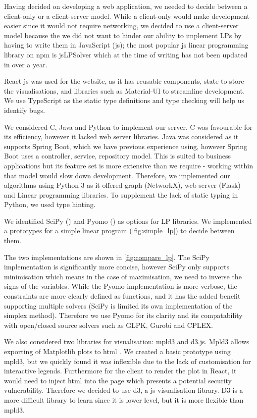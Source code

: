 Having decided on developing a web application, we needed to decide between a client-only or a client-server model. While a client-only would make development easier since it would not require networking, we decided to use a client-server model because the we did not want to hinder our ability to implement LPs by having to write them in JavaScript (\acrshort{js}); the most popular \acrshort{js} linear programming library on npm is jsLPSolver which at the time of writing has not been updated in over a year.

React \acrshort{js} was used for the website, as it has reusable components, state to store the visualisations, and libraries such as Material-UI to streamline development. We use TypeScript as the static type definitions and type checking will help us identify bugs.

We considered C, Java and Python to implement our server. C was favourable for its efficiency, however it lacked web server libraries. Java was considered as it supports Spring Boot, which we have previous experience using, however Spring Boot uses a controller, service, repository model. This is suited to business applications but its feature set is more extensive than we require - working within that model would slow down development. Therefore, we implemented our algorithms using Python 3 as it offered graph (NetworkX), web server (Flask) and Linear programming libraries. To supplement the lack of static typing in Python, we used type hinting.

We identified SciPy (\cite{nmeth_scipy_2020}) and Pyomo (\cite{hart_pyomo_2011}) as options for LP libraries. We implemented a prototypes for a simple linear program (\cref{fig:simple_lp}) to decide between them.



The two implementations are shown in \cref{fig:compare_lp}. The SciPy implementation is significantly more concise, however SciPy only supports minimisation which means in the case of maximisation, we need to inverse the signs of the variables. While the Pyomo implementation is more verbose, the constraints are more clearly defined as functions, and it has the added benefit supporting multiple solvers (SciPy is limited its own implementation of the simplex method). Therefore we use Pyomo for its clarity and its compatability with open/closed source solvers such as GLPK, Gurobi and CPLEX.



We also considered two libraries for visualisation: mpld3 and \acrshort{d3}.js. Mpld3 allows exporting of Matplotlib plots to \acrshort{html} . We created a basic prototype using mpld3, but we quickly found it was inflexible due to the lack of customisation for interactive legends. Furthermore for the client to render the plot in React, it would need to inject \acrshort{html} into the page which presents a potential security vulnerability. Therefore we decided to use \acrshort{d3}, a \acrshort{js} visualisation library. D3 is a more difficult library to learn since it is lower level, but it is more flexible than mpld3.
